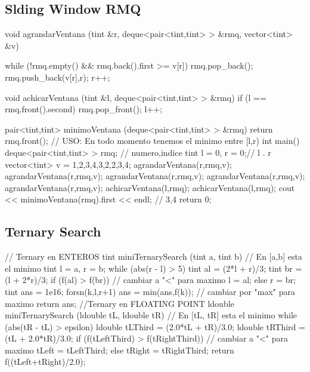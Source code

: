\subsection{Slding Window RMQ}
\begin{code}
void agrandarVentana (tint &r, deque<pair<tint,tint> > &rmq, vector<tint> &v)
{
	while (!rmq.empty() && rmq.back().first >= v[r])
		rmq.pop_back();
	rmq.push_back({v[r],r});
	r++;
	
}

void achicarVentana (tint &l, deque<pair<tint,tint> > &rmq)
{
	if (l == rmq.front().second)
		rmq.pop_front();
	l++;
}

pair<tint,tint> minimoVentana (deque<pair<tint,tint> > &rmq)
{
	return rmq.front();
}
// USO: En todo momento tenemos el minimo entre [l,r)
int main()
{
	deque<pair<tint,tint> > rmq; // {numero,indice}
	tint l = 0, r = 0;//  l   . r
	vector<tint> v = {1,2,3,4,3,2,2,3,4};
	agrandarVentana(r,rmq,v);
	agrandarVentana(r,rmq,v);
	agrandarVentana(r,rmq,v);
	agrandarVentana(r,rmq,v);
	agrandarVentana(r,rmq,v);
	achicarVentana(l,rmq);
	achicarVentana(l,rmq);
	cout << minimoVentana(rmq).first << endl;	// {3,4}
	return 0;
}
\end{code}

\subsection{Ternary Search}
\begin{code}
// Ternary en ENTEROS
tint miniTernarySearch (tint a, tint b) // En [a,b] esta el minimo
{
	tint l = a, r = b;
	while (abs(r - l) > 5)
	{
		tint al = (2*l + r)/3;
		tint br = (l + 2*r)/3;
		if (f(al) > f(br)) // cambiar a "<" para maximo
			l = al;
		else
			r = br;			
	}
	tint ans = 1e16;
	forsn(k,l,r+1)
		ans = min(ans,f(k));  // cambiar por "max" para maximo
	return ans;
}
//Ternary en FLOATING POINT
ldouble miniTernarySearch (ldouble tL, ldouble tR) // En [tL, tR] esta el minimo
{
	while (abs(tR - tL) > epsilon)
	{
		ldouble tLThird = (2.0*tL + tR)/3.0;
		ldouble tRThird = (tL + 2.0*tR)/3.0;
		if (f(tLeftThird) > f(tRightThird)) // cambiar a "<" para maximo
			tLeft = tLeftThird;
		else
			tRight = tRightThird;			
	}
	return f((tLeft+tRight)/2.0);
}
\end{code}
